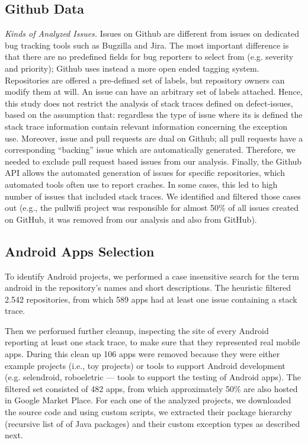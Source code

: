 \documentclass[conference]{IEEEtran}
\begin{document}
\subsection{Github Data}
\label{sec:git}

\noindent\emph{Kinds of Analyzed Issues.} Issues on Github are different from
issues on dedicated bug tracking tools such as Bugzilla and Jira. The most
important difference is that there are no predefined fields for bug reporters to
select from (e.g. severity and priority); Github uses instead a more open ended
tagging system. Repositories are offered a pre-defined set of labels, but
repository owners can modify them at will. An issue can have an arbitrary set of
labels attached. Hence, this study does not restrict the analysis of stack
traces defined on defect-issues, based on the assumption that: regardless the
type of issue where its is defined the stack trace information contain relevant
information concerning the exception use. Moreover, issue and pull requests are
dual on Github; all pull requests have a corresponding ``backing'' issue which
are automatically generated. Therefore, we needed to exclude pull request based
issues from our analysis. Finally, the Github API allows the automated
generation of issues for specific repositories, which automated tools often use
to report crashes. In some cases, this led to high number of issues that
included stack traces. We identified and filtered those cases out (e.g.,
the \textsf{pullwifi} project was responsible for almost 50\% of all issues created on
GitHub, it was removed from our analysis and also from GitHub).

\subsection{Android Apps Selection}
\label{sec:android}

To identify Android projects, we performed a case insensitive search for the
term \textsf{android} in the repository's names and short descriptions.  The
heuristic filtered 2.542 repositories, from which 589 apps had at least one
issue containing a stack trace.

Then we performed further cleanup, inspecting the site of every Android
reporting at least one stack trace, to make sure that they represented real
mobile apps. During this clean up 106 apps were removed because they were either
example projects (i.e., toy projects) or tools to support Android development
(e.g. \textsf{selendroid}, \textsf{roboeletric} --- tools to support the testing of Android apps).
The filtered set consisted of 482 apps, from which approximately 50\% are also
hosted in Google Market Place. For each one of the analyzed projects, we
downloaded the source code and using custom scripts, we extracted their package
hierarchy (recursive list of of Java packages) and their custom exception types
as described next.
\end{document}
